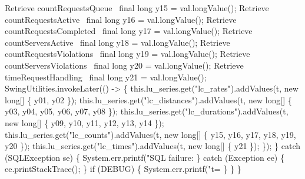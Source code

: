      \LA{}Retrieve countRequestsQueue~{\nwtagstyle{}}\RA{}        final long y15 = val.longValue();
      \LA{}Retrieve countRequestsActive~{\nwtagstyle{}}\RA{}       final long y16 = val.longValue();
      \LA{}Retrieve countRequestsCompleted~{\nwtagstyle{}}\RA{}    final long y17 = val.longValue();
      \LA{}Retrieve countServersActive~{\nwtagstyle{}}\RA{}        final long y18 = val.longValue();
      \LA{}Retrieve countRequestsViolations~{\nwtagstyle{}}\RA{}   final long y19 = val.longValue();
      \LA{}Retrieve countServersViolations~{\nwtagstyle{}}\RA{}    final long y20 = val.longValue();
      \LA{}Retrieve timeRequestHandling~{\nwtagstyle{}}\RA{}       final long y21 = val.longValue();
      SwingUtilities.invokeLater(() -> \{
         this.lu_series.get("lc_rates").addValues(t, new long[] \{
            y01, y02 \});
         this.lu_series.get("lc_distances").addValues(t, new long[] \{
            y03, y04, y05, y06, y07, y08 \});
         this.lu_series.get("lc_durations").addValues(t, new long[] \{
            y09, y10, y11, y12, y13, y14 \});
         this.lu_series.get("lc_counts").addValues(t, new long[] \{
            y15, y16, y17, y18, y19, y20 \});
         this.lu_series.get("lc_times").addValues(t, new long[] \{
            y21 \});
      \});
    \} catch (SQLException se) \{
      System.err.printf("SQL failure: %
    \} catch (Exception ee) \{
      ee.printStackTrace();
    \}
    if (DEBUG) \{
      System.err.printf("t=%
    \}
  \}
\}
\nwendcode{}\nwdocspar

